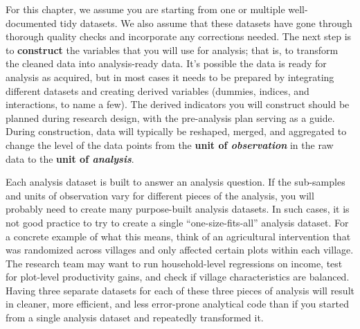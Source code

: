 For this chapter, we assume you are starting from
one or multiple well-documented tidy datasets.
We also assume that these datasets
have gone through thorough quality checks
and incorporate any corrections needed.
The next step is to \textbf{construct}
the variables that you will use for analysis;
that is, to transform the cleaned data into analysis-ready data.
It's possible the data is ready for analysis as acquired,
but in most cases it needs to be prepared by integrating different datasets
and creating derived variables
(dummies, indices, and interactions, to name a few).
The derived indicators you will construct should be
planned during research design,
with the pre-analysis plan serving as a guide.
During construction, data will typically be
reshaped, merged, and aggregated to change the level of the data points
from the \textbf{unit of \textit{observation}} in the raw data
to the \textbf{unit of \textit{analysis}}.

Each analysis dataset is built to answer an analysis question.
If the sub-samples and units of observation
vary for different pieces of the analysis,
you will probably need to create many purpose-built analysis datasets.
In such cases, it is not good practice
to try to create a single ``one-size-fits-all'' analysis dataset.
For a concrete example of what this means,
think of an agricultural intervention
that was randomized across villages
and only affected certain plots within each village.
The research team may want to
run household-level regressions on income,
test for plot-level productivity gains,
and check if village characteristics are balanced.
Having three separate datasets for each of these three pieces of analysis
will result in cleaner, more efficient, and less error-prone analytical code than if
you started from a single analysis dataset and repeatedly transformed it.


